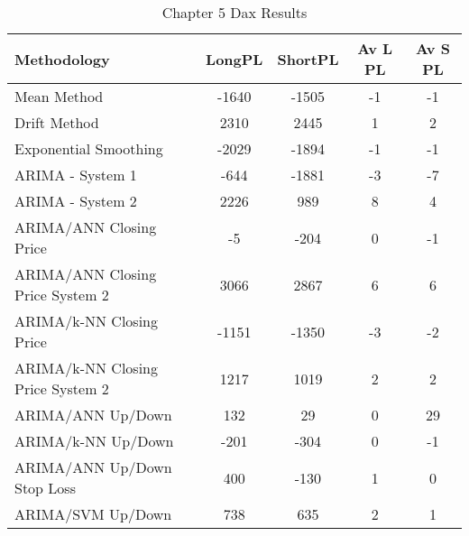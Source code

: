 \begin{table}[ht]
\centering
\caption[Chapter 5 Dax Results]{Chapter 5 Dax Results} 
\label{tab:chp6:dax2_summary}
\begin{tabular}{lcccc}
  \toprule Methodology & LongPL & ShortPL & Av L PL & Av S PL \\ 
  \midrule Mean Method & -1640 & -1505 & -1 & -1 \\ 
  Drift Method & 2310 & 2445 & 1 & 2 \\ 
  Exponential Smoothing & -2029 & -1894 & -1 & -1 \\ 
  ARIMA - System 1 & -644 & -1881 & -3 & -7 \\ 
  ARIMA - System 2 & 2226 & 989 & 8 & 4 \\ 
  ARIMA/ANN Closing Price & -5 & -204 & 0 & -1 \\ 
  ARIMA/ANN Closing Price System 2 & 3066 & 2867 & 6 & 6 \\ 
  ARIMA/k-NN Closing Price & -1151 & -1350 & -3 & -2 \\ 
  ARIMA/k-NN Closing Price System 2 & 1217 & 1019 & 2 & 2 \\ 
  ARIMA/ANN Up/Down & 132 & 29 & 0 & 29 \\ 
  ARIMA/k-NN Up/Down & -201 & -304 & 0 & -1 \\ 
  ARIMA/ANN Up/Down Stop Loss & 400 & -130 & 1 & 0 \\ 
  ARIMA/SVM Up/Down & 738 & 635 & 2 & 1 \\ 
   \bottomrule \end{tabular}
\end{table}
